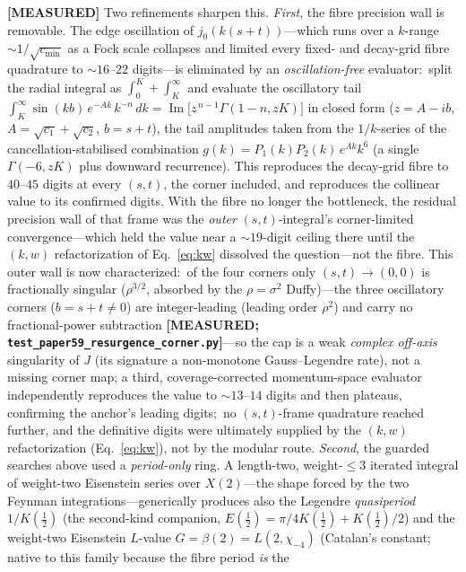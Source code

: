 \documentclass[aps,pra,twocolumn,superscriptaddress,longbibliography]{revtex4-2}
\begin{document}
\textbf{[MEASURED]} Two refinements sharpen this.  \emph{First}, the fibre
precision wall is removable.  The edge oscillation of $j_{0}(k(s+t))$---which runs
over a $k$-range $\sim\!1/\sqrt{c_{\min}}$ as a Fock scale collapses and limited
every fixed- and decay-grid fibre quadrature to $\sim\!16$--$22$ digits---is
eliminated by an \emph{oscillation-free} evaluator:\ split the radial integral as
$\int_{0}^{K}+\int_{K}^{\infty}$ and evaluate the oscillatory tail
$\int_{K}^{\infty}\sin(kb)\,e^{-Ak}\,k^{-n}\,dk=\operatorname{Im}\!\big[z^{\,n-1}
\Gamma(1{-}n,zK)\big]$ in closed form ($z=A-ib$, $A=\sqrt{c_{1}}+\sqrt{c_{2}}$,
$b=s+t$), the tail amplitudes taken from the $1/k$-series of the
cancellation-stabilised combination $g(k)=P_{1}(k)P_{2}(k)\,e^{Ak}k^{6}$ (a single
$\Gamma(-6,zK)$ plus downward recurrence).  This reproduces the decay-grid fibre to
$40$--$45$ digits at every $(s,t)$, the corner included, and reproduces the collinear
value to its confirmed digits.  With the fibre no longer the bottleneck, the residual
precision wall of that frame was the \emph{outer} $(s,t)$-integral's corner-limited
convergence---which held the value near a $\sim\!19$-digit ceiling there until the $(k,w)$
refactorization of Eq.~\eqref{eq:kw} dissolved the question---not the fibre.  This outer wall is now characterized:\ of the
four corners only $(s,t)\to(0,0)$ is fractionally singular ($\rho^{3/2}$, absorbed by the
$\rho=\sigma^{2}$ Duffy)---the three oscillatory corners ($b=s+t\ne0$) are integer-leading (leading
order $\rho^{2}$) and carry no fractional-power subtraction \textbf{[MEASURED;
\texttt{test\_paper59\_resurgence\_corner.py}]}---so the cap is a weak \emph{complex off-axis}
singularity of $J$ (its signature a non-monotone Gauss--Legendre rate), not a missing corner map;
a third, coverage-corrected momentum-space evaluator independently reproduces the value to
$\sim\!13$--$14$ digits and then plateaus, confirming the anchor's leading digits;\ no
$(s,t)$-frame quadrature reached further, and the definitive digits were ultimately supplied by
the $(k,w)$ refactorization (Eq.~\eqref{eq:kw}), not by the modular route.  \emph{Second}, the guarded searches above used a
\emph{period-only} ring.  A length-two, weight-$\le3$ iterated integral of
weight-two Eisenstein series over $X(2)$---the shape forced by the two Feynman
integrations---generically produces also the Legendre \emph{quasiperiod}
$1/K(\tfrac12)$ (the second-kind companion, $E(\tfrac12)=\pi/4K(\tfrac12)+
K(\tfrac12)/2$) and the weight-two Eisenstein $L$-value $G=\beta(2)=L(2,\chi_{-4})$
(Catalan's constant; native to this family because the fibre period \emph{is} the
\end{document}

